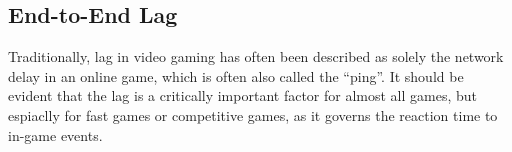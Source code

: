 




\subsection{End-to-End Lag}

Traditionally, lag in video gaming has often been described as solely the network delay in an online game, which is often also called the ``ping''. It should be evident that the lag is a critically important factor for almost all games, but espiaclly for fast games or competitive games, as it governs the reaction time to in-game events.

